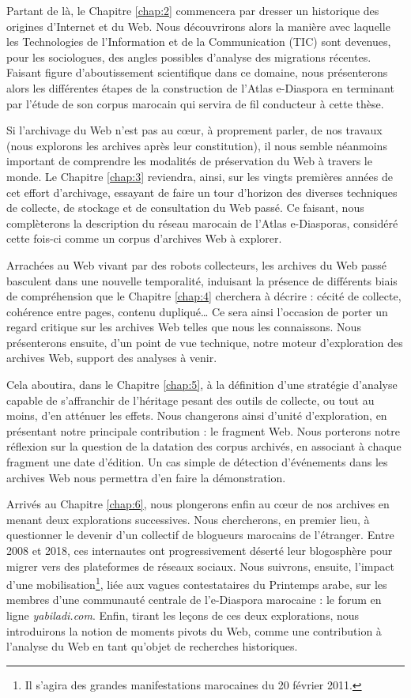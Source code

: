 \documentclass[symmetric,justified,marginals=raggedouter]{tufte-book}
\begin{document}
\noindent Partant de là, le Chapitre \ref{chap:2} commencera par dresser un historique des origines d'Internet et du Web. Nous découvrirons alors la manière avec laquelle les Technologies de l'Information et de la Communication (TIC) sont devenues, pour les sociologues, des angles possibles d'analyse des migrations récentes. Faisant figure d'aboutissement scientifique dans ce domaine, nous présenterons alors les différentes étapes de la construction de l'Atlas e-Diaspora en terminant par l'étude de son corpus marocain qui servira de fil conducteur à cette thèse.

Si l'archivage du Web n'est pas au cœur, à proprement parler, de nos travaux (nous explorons les archives après leur constitution), il nous semble néanmoins important de comprendre les modalités de préservation du Web à travers le monde. Le Chapitre \ref{chap:3} reviendra, ainsi, sur les vingts premières années de cet effort d'archivage, essayant de faire un tour d'horizon des diverses techniques de collecte, de stockage et de consultation du Web passé. Ce faisant, nous complèterons la description du réseau marocain de l'Atlas e-Diasporas, considéré cette fois-ci comme un corpus d'archives Web à explorer.    

Arrachées au Web vivant par des robots collecteurs, les archives du Web passé basculent dans une nouvelle temporalité, induisant la présence de différents biais de compréhension que le Chapitre \ref{chap:4} cherchera à décrire : cécité de collecte, cohérence entre pages, contenu dupliqué\ldots{} Ce sera ainsi l'occasion de porter un regard critique sur les archives Web telles que nous les connaissons. Nous présenterons ensuite, d'un point de vue technique, notre moteur d'exploration des archives Web, support des analyses à venir. 

Cela aboutira, dans le Chapitre \ref{chap:5}, à la définition d'une stratégie d'analyse capable de s'affranchir de l'héritage pesant des outils de collecte, ou tout au moins, d'en atténuer les effets. Nous changerons ainsi d'unité d'exploration, en présentant notre principale contribution : le fragment Web. Nous porterons notre réflexion sur la question de la datation des corpus archivés, en associant à chaque fragment une date d'édition. Un cas simple de détection d'événements dans les archives Web nous permettra d'en faire la démonstration.

Arrivés au Chapitre \ref{chap:6}, nous plongerons enfin au cœur de nos archives en menant deux explorations successives. Nous chercherons, en premier lieu, à questionner le devenir d'un collectif de blogueurs marocains de l'étranger. Entre 2008 et 2018, ces internautes ont progressivement déserté leur blogosphère pour migrer vers des plateformes de réseaux sociaux. Nous suivrons, ensuite, l'impact d'une mobilisation\footnote{\RaggedOuter Il s'agira des grandes manifestations marocaines du 20 février 2011.}, liée aux vagues contestataires du Printemps arabe, sur les membres d'une communauté centrale de l'e-Diaspora marocaine : le forum en ligne \textit{yabiladi.com}. Enfin, tirant les leçons de ces deux explorations, nous introduirons la notion de moments pivots du Web, comme une contribution à l'analyse du Web en tant qu'objet de recherches historiques. 
\end{document}
